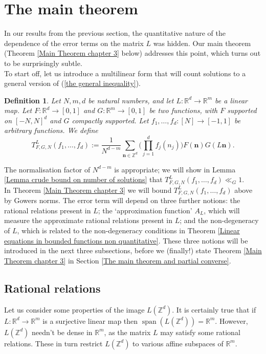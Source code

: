 \documentclass[12pt,a4paper,twoside,reqno]{amsart}
\newtheorem{Definition}[Theorem]{Definition}
\newcommand{\spn}{\operatorname{span}}
\numberwithin{equation}{section}
\begin{document}
\section{The main theorem}
\label{section history}


In our results from the previous section, the quantitative nature of the dependence of the error terms on the matrix $L$ was hidden. Our main theorem (Theorem \ref{Main Theorem chapter 3} below) addresses this point, which turns out to be surprisingly subtle. \\

To start off, let us introduce a multilinear form that will count solutions to a general version of (\ref{the general inequality}).
\begin{Definition}
\label{Definition solution count}
Let $N,m,d$ be natural numbers, and let $L:\mathbb{R}^d \longrightarrow \mathbb{R}^m$ be a linear map. Let $F:\mathbb{R}^d\longrightarrow [0,1]$ and $G:\mathbb{R}^m\longrightarrow [0,1]$ be two functions, with $F$ supported on $[-N,N]^d$ and $G$ compactly supported. Let $f_1,\dots,f_d:[N]\longrightarrow [-1,1]$ be arbitrary functions. We define 
\begin{equation}
\label{original inequality}
T_{F,G,N}^L(f_1,\dots,f_d) :=  \frac{1}{N^{d-m}}\sum\limits_{\mathbf{n}\in \mathbb{Z}^d}\Big(\prod\limits_{j=1}^d f_j(n_j)\Big)F(\mathbf{n})G(L\mathbf{n}).
\end{equation}
\end{Definition}
\noindent The normalisation factor of $N^{d-m}$ is appropriate; we will show  in Lemma \ref{Lemma crude bound on number of solutions} that $T_{F,G,N}^L(f_1,\dots,f_d) \ll_G 1$. \\

In Theorem \ref{Main Theorem chapter 3} we will bound $T_{F,G,N}^L(f_1,\dots,f_d)$ above by Gowers norms. The error term will depend on three further notions: the rational relations present in $L$; the `approximation function' $A_L$, which will measure the approximate rational relations present in $L$; and the non-degeneracy of $L$, which is related to the non-degeneracy conditions in Theorem \ref{Linear equations in bounded functions non quantitative}. These three notions will be introduced in the next three subsections, before we (finally!) state Theorem \ref{Main Theorem chapter 3} in Section \ref{The main theorem and partial converse}.\\

\subsection{Rational relations}
\label{Section Rational dimension}
Let us consider some properties of the image $L(\mathbb{Z}^d)$. It is certainly true that if $L:\mathbb{R}^d \longrightarrow \mathbb{R}^m$ is a surjective linear map then $\spn(L(\mathbb{Z}^d)) = \mathbb{R}^m$. However, $L(\mathbb{Z}^d)$ needn't be dense in $\mathbb{R}^m$, as the matrix $L$ may satisfy some rational relations. These in turn restrict $L(\mathbb{Z}^d)$ to various affine subspaces of $\mathbb{R}^m$.
\end{document}
